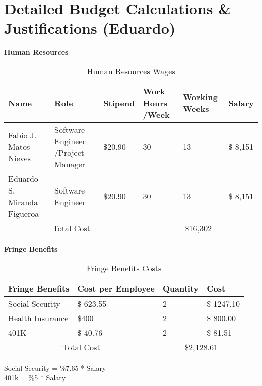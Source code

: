  \section{Detailed Budget Calculations \& Justifications (Eduardo)}
\begin{table}[H]
    \centering
    \textbf{Human Resources}
    \begin{tabular}{||m{}|m{}|m{}|m{}|m{}|m{}||}
     \hline
     Name & Role & Stipend & Work Hours /Week & Working Weeks & Salary\\
     \hline
     Fabio J. Matos Nieves & Software Engineer /Project Manager& \$20.90 & 30 & 13 & \$ 8,151\\ 
     \hline
     Eduardo S. Miranda Figueroa & Software Engineer & \$20.90 & 30 & 13 & \$ 8,151 \\
    
     \hline
     \multicolumn{3}{||c|}{Total Cost} & \multicolumn{3}{c||}{\$16,302}\\
     \hline
    \end{tabular}
    \caption {Human Resources Wages}
    \label{table:2}
\end{table}
\begin{table}[H]
    \centering
    \textbf{Fringe Benefits\cite{WhatAreFringe}}
    \begin{tabular}{||m{}|m{}|m{}|m{}||}
        \hline 
        Fringe Benefits & Cost per Employee & Quantity & Cost\\
        \hline
        Social Security &  \$ 623.55 & 2 & \$ 1247.10\\ 
        \hline
        Health Insurance & \$400 & 2 & \$ 800.00 \\
        \hline
        401K & \$ 40.76 & 2 & \$ 81.51\\ 

        \hline
        \multicolumn{2}{||c|}{Total Cost} & \multicolumn{2}{c||}{\$2,128.61}\\
        \hline
       \end{tabular}
       \caption {Fringe Benefits Costs}
       \label{table:3}
       Social Security = \%7.65 * Salary\\
401k = \%5 * Salary\\
\end{table}
